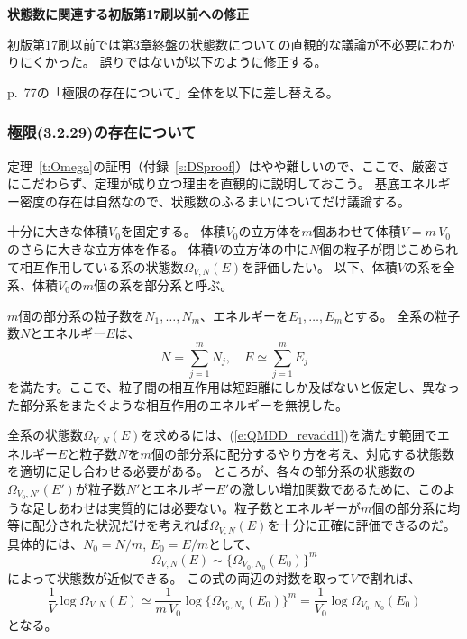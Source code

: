 \documentclass[12pt,a4paper]{jsarticle}
\begin{document}
\noindent
{\bf 状態数に関連する初版第17刷以前への修正}

\medskip\noindent
初版第17刷以前では第3章終盤の状態数についての直観的な議論が不必要にわかりにくかった。
誤りではないが以下のように修正する。


\bigskip

\noindent
p.~77の「極限の存在について」全体を以下に差し替える。



\subsubsection*{極限(3.2.29)の存在について}
定理~\ref{t:Omega}の証明（付録~\ref{s:DSproof}）はやや難しいので、ここで、厳密さにこだわらず、定理が成り立つ理由を直観的に説明しておこう。
基底エネルギー密度の存在は自然なので、状態数のふるまいについてだけ議論する。


十分に大きな体積$V_0$を固定する。
体積$V_0$の立方体を$m$個あわせて体積$V=m\,V_0$のさらに大きな立方体を作る。
体積$V$の立方体の中に$N$個の粒子が閉じこめられて相互作用している系の状態数$\Omega_{V,N}(E)$を評価したい。
以下、体積$V$の系を全系、体積$V_0$の$m$個の系を部分系と呼ぶ。

$m$個の部分系の粒子数を$N_1,\ldots,N_m$、エネルギーを$E_1,\ldots,E_m$とする。
全系の粒子数$N$とエネルギー$E$は、
\begin{equation}
N=\sum_{j=1}^mN_j,\quad E\simeq\sum_{j=1}^mE_j
\tag{3.2.31}
\label{e:QMDD_revadd1}
\end{equation}
を満たす。ここで、粒子間の相互作用は短距離にしか及ばないと仮定し、異なった部分系をまたぐような相互作用のエネルギーを無視した。

全系の状態数$\Omega_{V,N}(E)$を求めるには、(\ref{e:QMDD_revadd1})を満たす範囲でエネルギー$E$と粒子数$N$を$m$個の部分系に配分するやり方を考え、対応する状態数を適切に足し合わせる必要がある。
ところが、各々の部分系の状態数の$\Omega_{V_0,N'}(E')$が粒子数$N'$とエネルギー$E'$の激しい増加関数であるために、このような足しあわせは実質的には必要ない。粒子数とエネルギーが$m$個の部分系に均等に配分された状況だけを考えれば$\Omega_{V,N}(E)$を十分に正確に評価できるのだ。
具体的には、$N_0=N/m$, $E_0=E/m$として、
\begin{equation}
\Omega_{V,N}(E)\sim\{\Omega_{V_0,N_0}(E_0)\}^m
\tag{3.2.32}
\label{e:QMDDADD2}
\end{equation}
によって状態数が近似できる。
この式の両辺の対数を取って$V$で割れば、
\begin{equation}
\frac{1}{V}\log\Omega_{V,N}(E)\simeq
\frac{1}{m\,V_0}\log \{\Omega_{V_0,N_0}(E_0)\}^m
=\frac{1}{V_0}\log\Omega_{V_0,N_0}(E_0)
\tag{3.2.33}
\label{e:QMDDADD3}
\end{equation}
となる。
\end{document}
